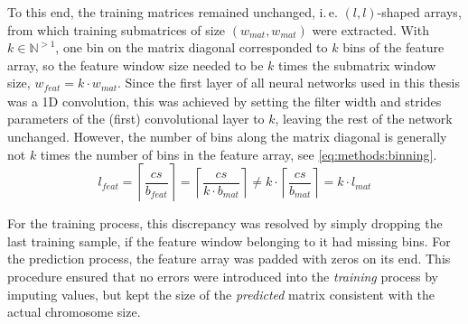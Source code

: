 To this end, the training matrices remained unchanged, i.\,e. $(l, l)$-shaped arrays, from which training submatrices of size  $(w_\mathit{mat}, w_\mathit{mat})$
were extracted. 
With $k \in \mathbb{N}^{>1}$, one bin on the matrix diagonal corresponded to $k$ bins of the feature array,
so the feature window size needed to be $k$ times the submatrix window size, $w_\mathit{feat} = k \cdot w_\mathit{mat}$.
Since the first layer of all neural networks used in this thesis was a 1D convolution,
this was achieved by setting the filter width and strides parameters of the (first) convolutional layer to $k$, leaving the rest of the network unchanged.
However, the number of bins along the matrix diagonal is generally not $k$ times the number of bins in the feature array,
see \cref{eq:methods:binning}.
\begin{equation}
 l_\mathit{feat} = \left \lceil{\frac{cs}{b_\mathit{feat}}}\right \rceil
                = \left \lceil{\frac{cs}{k \cdot b_\mathit{mat}}}\right \rceil 
                \not = k \cdot \left \lceil{\frac{cs}{ b_\mathit{mat}}}\right \rceil
                = k \cdot l_\mathit{mat} \label{eq:methods:binning}
\end{equation}

For the training process, this discrepancy was resolved by simply dropping the last training sample, 
if the feature window belonging to it had missing bins.
For the prediction process, the feature array was padded with zeros on its end.
This procedure ensured that no errors were introduced into the \emph{training} process by imputing values,
but kept the size of the \emph{predicted} matrix consistent with the actual chromosome size.

